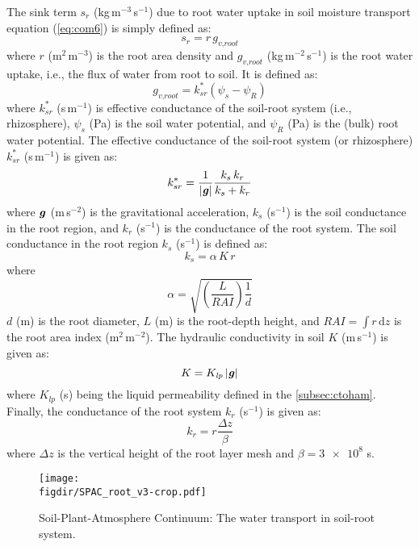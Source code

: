 The sink term $s_r$ (kg\,m$^{-3}$\,s$^{-1}$) due to root water uptake in soil moisture transport equation (\cref{eq:com6}) is simply defined as:
\begin{equation}
s_r = r \, g_{\textit{v,root}}
\end{equation}
where $r$ (m$^2$\,m$^{-3}$) is the root area density and $g_{\textit{v,root}}$ (kg\,m$^{-2}$\,s$^{-1}$) is the root water uptake, i.e., the flux of water from root to soil. It is defined as:
\begin{equation}
g_{\textit{v,root}} = k_{sr}^*\left(\psi_s - \psi_R\right)
\end{equation}
where $k_{sr}^*$ (s\,m$^{-1}$) is effective conductance of the soil-root system (i.e., rhizosphere), $\psi_s$ (Pa) is the soil water potential, and $\psi_R$ (Pa) is the (bulk) root water potential. The effective conductance of the soil-root system (or rhizosphere) $k_{sr}^*$ (s\,m$^{-1}$) is given as:
\begin{equation}
k_{sr}^* = \frac{1}{|\textbf{\textit{g}}|} \frac{k_s\,k_r}{k_s + k_r}
\end{equation}
where $\textbf{\textit{g}}$ (m\,s$^{-2}$) is the gravitational acceleration, $k_s$ (s$^{-1}$) is the soil conductance in the root region, and $k_r$ (s$^{-1}$) is the conductance of the root system. The soil conductance in the root region $k_s$ (s$^{-1}$) is defined as:
\begin{equation}
k_s = \alpha \, K \, r
\end{equation}
where
\begin{equation}
\alpha =  \sqrt{\left(\frac{L}{\textit{RAI}}\right) \frac{1}{d}}
\end{equation}
$d$ (m) is the root diameter, $L$ (m) is the root-depth height, and $\textit{RAI} = \int r\,\mathrm{d}z$ is the root area index (m$^2$\,m$^{-2}$). The hydraulic conductivity in soil $K$ (m\,s$^{-1}$) is given as:
\begin{equation}
K = K_{\textit{lp}} \, |\textbf{\textit{g}}|
\end{equation}
where $K_{\textit{lp}}$ (s) being the liquid permeability defined in the \cref{subsec:ctoham}. Finally, the conductance of the root system $k_r$ (s$^{-1}$) is given as:
\begin{equation}
k_r = r \frac{\Delta z}{\beta}
\end{equation}
where $\Delta z$ is the vertical height of the root layer mesh and $\beta = \num{3e8}$ s. 

\begin{figure}[t]
	\centering
	\texttt{[image: \\figdir/SPAC\_root\_v3-crop.pdf]}
	\caption{Soil-Plant-Atmosphere Continuum: The water transport in soil-root system.}
	\label{fig:SPAC_root}
\end{figure}

